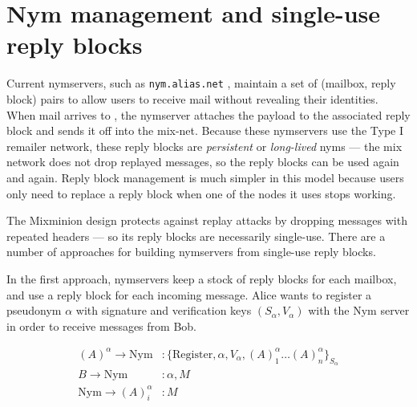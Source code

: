 \documentclass[11pt]{IEEEtran}
\newcommand\emailaddr{\begingroup \def\UrlLeft{<}\def\UrlRight{>}\urlstyle{tt}\Url}
\begin{document}


\section{Nym management and single-use reply blocks}
\label{sec:nymservers}

Current nymservers, such as {\tt nym.alias.net} \cite{nym-alias-net},
maintain a set of (mailbox, reply block) pairs to allow users to
receive mail without revealing their identities. When mail arrives to
\emailaddr{bob@nym.alias.net}, the nymserver attaches the payload to
the associated
reply block and sends it off into the mix-net. Because these nymservers
use the Type I remailer network, these reply blocks are \emph{persistent}
or \emph{long-lived} nyms --- the mix network does not drop replayed
messages, so the reply blocks can be used again and again. Reply block
management is much simpler in this model because users only need to
replace a reply block when one of the nodes it uses stops working.

The Mixminion design protects against replay attacks by dropping
messages with repeated headers --- so its reply blocks are necessarily
single-use. There are a number of approaches for building nymservers
from single-use reply blocks.

In the first approach, nymservers keep a stock of reply blocks for
each mailbox, and use a reply block for each incoming message. 
Alice wants to register a pseudonym $\alpha$ with signature and
verification keys $(S_\alpha,V_\alpha)$ with the Nym server in order
to receive messages from Bob.

\begin{equation}
\begin{aligned}
(A)^\alpha \rightarrow \mathrm{Nym}&: \{\mathrm{Register} , \alpha, V_{\alpha}, (A)^\alpha_1 \dots
(A)^\alpha_n\}_{S_\alpha} \\ 
B \rightarrow \mathrm{Nym}&: \alpha, M \\ 
\mathrm{Nym} \rightarrow (A)^\alpha_i&: M \\
\end{aligned}
\end{equation}
\end{document}
